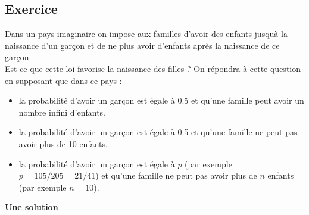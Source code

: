 \documentclass[a4paper,11pt]{book}
\begin{document}
\subsection{Exercice}
Dans un pays imaginaire on impose aux familles d'avoir des enfants jusqu\`a la
naissance d'un gar\c{c}on et de ne plus avoir d'enfants apr\`es 
la naissance de ce gar\c{c}on.\\
Est-ce que cette loi favorise la naissance des filles ?
On r\'epondra \`a cette question en supposant que dans ce pays :
\begin{itemize}
\item la probabilit\'e d'avoir un gar\c{c}on est \'egale \`a 0.5 et qu'une 
famille peut avoir un nombre infini d'enfants.
\item la probabilit\'e d'avoir un gar\c{c}on est \'egale \`a 0.5 et qu'une 
famille ne peut pas avoir plus de 10 enfants.
\item la probabilit\'e d'avoir un gar\c{c}on est \'egale \`a $p$ (par exemple 
$p=105/205=21/41$) et qu'une famille ne peut pas avoir plus de $n$ enfants (par
 exemple $n=10$).
\end{itemize}
{\bf Une solution}
\end{document}
